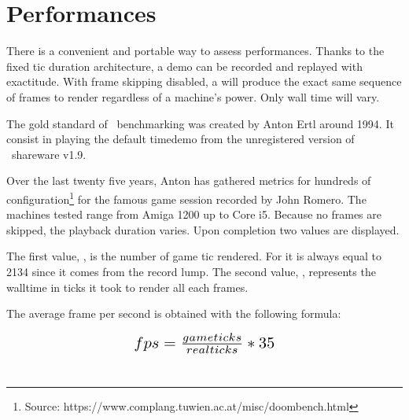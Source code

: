 \section{Performances} \label{performances}
There is a convenient and portable way to assess performances. Thanks to the fixed tic duration architecture, a demo can be recorded and replayed with exactitude. With frame skipping disabled, a  will produce the exact same sequence of frames to render regardless of a machine's power. Only wall time will vary.\\
\par
The gold standard of \doom~benchmarking was created by Anton Ertl around 1994. It consist in playing the default timedemo from the unregistered version of \doom~shareware v1.9.\\
\par
{}
\par
Over the last twenty five years, Anton has gathered metrics for hundreds of configuration\footnote{Source: https://www.complang.tuwien.ac.at/misc/doombench.html} for the famous game session recorded by John Romero. The machines tested range from Amiga 1200 up to Core i5. Because no frames are skipped, the playback duration varies. Upon completion two values are displayed.\\
\par
{}
\par

The first value, , is the number of game tic rendered. For  it is always equal to 2134 since it comes from the record lump. The second value, , represents the walltime in ticks it took to render all each frames.\\
\par
 The average frame per second is obtained with the following formula:\\
 \par 
\begin{equation*}
\resizebox{.4 \textwidth}{!} 
{
 $ fps = \frac{gameticks}{realticks} * 35 $ 
 }
 \end{equation*}\\

